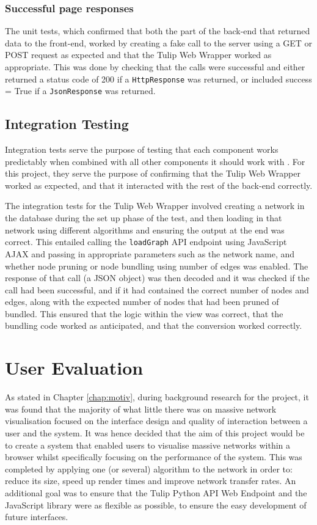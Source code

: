 \documentclass[../dissertation.tex]{subfiles}
\begin{document}
\subsubsection{Successful page responses}

The unit tests, which confirmed that both the part of the back-end that returned data to the front-end, worked by creating a fake call to the server using a GET or POST request as expected and that the Tulip Web Wrapper worked as appropriate. This was done by checking that the calls were successful and either returned a status code of 200 if a \texttt{HttpResponse} was returned, or included success = True if a \texttt{JsonResponse} was returned.

\subsection{Integration Testing}

Integration tests serve the purpose of testing that each component works predictably when combined with all other components it should work with \cite{basanieri2000practical}. For this project, they serve the purpose of confirming that the Tulip Web Wrapper worked as expected, and that it interacted with the rest of the back-end correctly.

The integration tests for the Tulip Web Wrapper involved creating a network in the database during the set up phase of the test, and then loading in that network using different algorithms and ensuring the output at the end was correct. This entailed calling the \texttt{loadGraph} API endpoint using JavaScript AJAX \cite{jquery-ajax} and passing in appropriate parameters such as the network name, and whether node pruning or node bundling using number of edges was enabled. The response of that call (a JSON object) was then decoded and it was checked if the call had been successful, and if it had contained the correct number of nodes and edges, along with the expected number of nodes that had been pruned of bundled. This ensured that the logic within the view was correct, that the bundling code worked as anticipated, and that the conversion worked correctly.

\section{User Evaluation}

As stated in Chapter \ref{chap:motiv}, during background research for the project, it was found that the majority of what little there was on massive network visualisation focused on the interface design and quality of interaction between a user and the system. It was hence decided that the aim of this project would be to create a system that enabled users to visualise massive networks within a browser whilst specifically focusing on the performance of the system. This was completed by applying one (or several) algorithm to the network in order to: reduce its size, speed up render times and improve network transfer rates. An additional goal was to ensure that the Tulip Python API Web Endpoint and the JavaScript library were as flexible as possible, to ensure the easy development of future interfaces.
\end{document}
